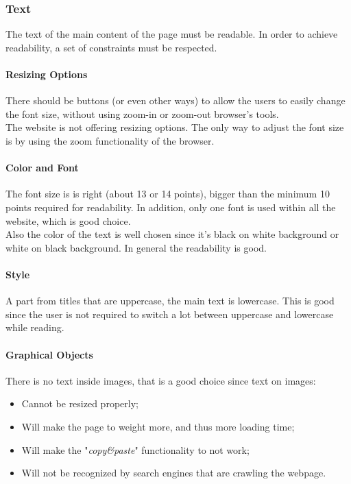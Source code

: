 \subsubsection{Text}
The text of the main content of the page must be readable. 
In order to achieve readability, a set of constraints must be respected.

\paragraph{Resizing Options}
There should be buttons (or even other ways) to allow the users to easily change the font size, without using zoom-in or zoom-out browser's tools.\\

The website is not offering resizing options. The only way to adjust the font size is by using the zoom functionality of the browser. 

\paragraph{Color and Font}
The font size is is right (about 13 or 14 points), bigger than the minimum 10 points required for readability. 
In addition, only one font is used within all the website, which is good choice.\\
Also the color of the text is well chosen since it's black on white background or white on black background. 
In general the readability is good.

\paragraph{Style}
A part from titles that are uppercase, the main text is lowercase. 
This is good since the user is not required to switch a lot between uppercase and lowercase while reading. 

\paragraph{Graphical Objects}
There is no text inside images, that is a good choice since text on images:
\begin{itemize}
\item Cannot be resized properly;
\item Will make the page to weight more, and thus more loading time;
\item Will make the "\textit{copy\&paste}" functionality to not work;
\item Will not be recognized by search engines that are crawling the webpage.
\end{itemize}


